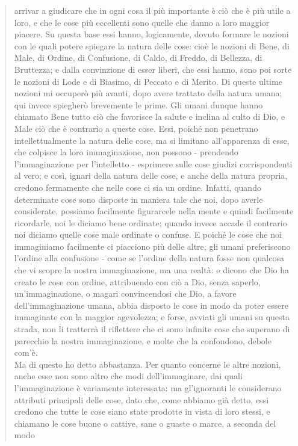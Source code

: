 \begin{quotation}
	arrivar a giudicare che in ogni cosa il più importante è ciò che è più utile a loro, e che le cose più eccellenti sono quelle che danno a loro maggior piacere. Su questa base essi hanno,
	logicamente, dovuto formare le nozioni con le quali potere spiegare la natura delle cose:
	cioè le nozioni di Bene, di Male, di Ordine, di Confusione, di Caldo, di Freddo, di Bellezza,
	di Bruttezza; e dalla convinzione di esser liberi, che essi hanno, sono poi sorte le nozioni di
	Lode e di Biasimo, di Peccato e di Merito. Di queste ultime nozioni mi occuperò più avanti,
	dopo avere trattato della natura umana; qui invece spiegherò brevemente le prime. Gli
	umani dunque hanno chiamato Bene tutto ciò che favorisce la salute e inclina al culto di
	Dio, e Male ciò che è contrario a queste cose. Essi, poiché non penetrano intellettualmente
	la natura delle cose, ma si limitano all’apparenza di esse, che colpisce la loro immaginazione, non possono - prendendo l’immaginazione per l’intelletto - esprimere sulle cose giudizi
	corrispondenti al vero; e così, ignari della natura delle cose, e anche della natura propria,
	credono fermamente che nelle cose ci sia un ordine. Infatti, quando determinate cose sono
	disposte in maniera tale che noi, dopo averle considerate, possiamo facilmente figurarcele
	nella mente e quindi facilmente ricordarle, noi le diciamo bene ordinate; quando invece accade il contrario noi diciamo quelle cose male ordinate o confuse. E poiché le cose che noi
	immaginiamo facilmente ci piacciono più delle altre, gli umani preferiscono l’ordine alla
	confusione - come se l’ordine della natura fosse non qualcosa che vi scopre la nostra immaginazione, ma una realtà: e dicono che Dio ha creato le cose con ordine, attribuendo con
	ciò a Dio, senza saperlo, un’immaginazione, o magari convincendosi che Dio, a favore
	dell’immaginazione umana, abbia disposto le cose in modo da poter essere immaginate con
	la maggior agevolezza; e forse, avviati gli umani su questa strada, non li tratterrà il riflettere che ci sono infinite cose che superano di parecchio la nostra immaginazione, e molte che
	la confondono, debole com’è.\\
	Ma di questo ho detto abbastanza. Per quanto concerne le altre nozioni, anche esse non sono altro che modi dell’immaginare, dai quali l’immaginazione
	è variamente interessata: ma gl’ignoranti le considerano attributi principali delle cose, dato
	che, come abbiamo già detto, essi credono che tutte le cose siano state prodotte in vista di
	loro stessi, e chiamano le cose buone o cattive, sane o guaste o marce, a seconda del modo

\end{quotation}
